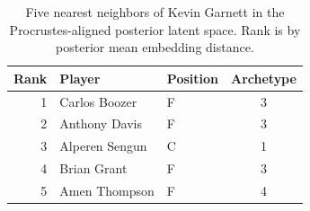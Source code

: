 \begin{table}[htbp]
  \centering\small
  \begin{tabular}{rllc}
    \toprule
    Rank & Player & Position & Archetype \\
    \midrule
    1 & Carlos Boozer & F & 3 \\
    2 & Anthony Davis & F & 3 \\
    3 & Alperen Sengun & C & 1 \\
    4 & Brian Grant & F & 3 \\
    5 & Amen Thompson & F & 4 \\
    \bottomrule
  \end{tabular}
  \caption{Five nearest neighbors of Kevin Garnett in the Procrustes-aligned posterior latent space. Rank is by posterior mean embedding distance.}
  \label{tab:Kevin_Garnett_neighbors}
\end{table}

